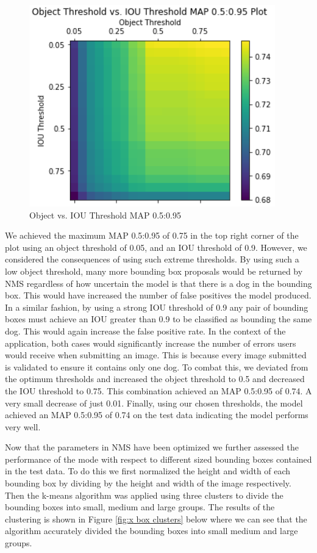 \documentclass{article}
\begin{document}
\begin{figure}[h]
\centering
	\includegraphics[scale=0.7]{final-report-images/map0.5to0.95.png}
\caption{Object vs. IOU Threshold MAP 0.5:0.95}
\label{fig:x object v iou}
\end{figure}

\noindent We achieved the maximum MAP 0.5:0.95 of 0.75 in the top right corner of the plot using an object threshold of 0.05, and an IOU threshold of 0.9.  However, we considered the consequences of using such extreme thresholds.  By using such a low object threshold, many more bounding box proposals would be returned by NMS regardless of how uncertain the model is that there is a dog in the bounding box.  This would have increased the number of false positives the model produced.  In a similar fashion, by using a strong IOU threshold of 0.9 any pair of bounding boxes must achieve an IOU greater than 0.9 to be classified as bounding the same dog.  This would again increase the false positive rate.  In the context of the application, both cases would significantly increase the number of errors users would receive when submitting an image.  This is because every image submitted is validated to ensure it contains only one dog.  To combat this, we deviated from the optimum thresholds and increased the object threshold to 0.5 and decreased the IOU threshold to 0.75.  This combination achieved an MAP 0.5:0.95 of 0.74.  A very small decrease of just 0.01.  Finally, using our chosen thresholds, the model achieved an MAP 0.5:0.95 of 0.74 on the test data indicating the model performs very well.

Now that the parameters in NMS have been optimized we further assessed the performance of the mode with respect to different sized bounding boxes contained in the test data.  To do this we first normalized the height and width of each bounding box by dividing by the height and width of the image respectively.  Then the k-means algorithm was applied using three clusters to divide the bounding boxes into small, medium and large groups.  The results of the clustering is shown in Figure \ref{fig:x box clusters} below where we can see that the algorithm accurately divided the bounding boxes into small medium and large groups.
\end{document}

